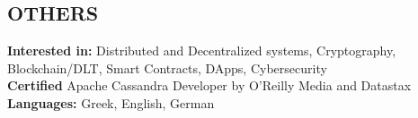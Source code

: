 \documentclass[margin, 10pt]{res} %
\begin{document}
\begin{resume}
\section{OTHERS} 

\textbf{Interested in:} Distributed and Decentralized systems, Cryptography, Blockchain/DLT, Smart Contracts, DApps, Cybersecurity \\
\textbf{Certified} Apache Cassandra Developer by O'Reilly Media and Datastax \\
\textbf{Languages:} Greek, English, German 


\end{resume}
\end{document}
